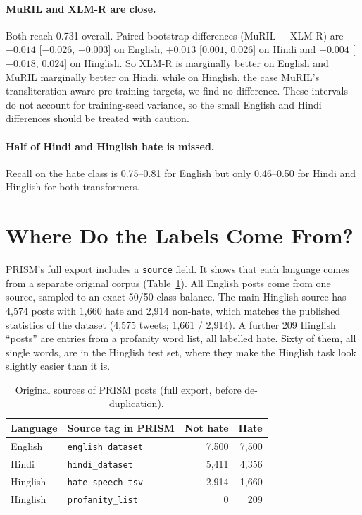 \documentclass[11pt,a4paper]{article}
\begin{document}
\paragraph{MuRIL and XLM-R are close.}
Both reach 0.731 overall.
Paired bootstrap differences (MuRIL $-$ XLM-R) are $-0.014$ [$-0.026$, $-0.003$] on English, $+0.013$ [$0.001$, $0.026$] on Hindi and $+0.004$ [$-0.018$, $0.024$] on Hinglish.
So XLM-R is marginally better on English and MuRIL marginally better on Hindi, while on Hinglish, the case MuRIL's transliteration-aware pre-training targets, we find no difference.
These intervals do not account for training-seed variance, so the small English and Hindi differences should be treated with caution.

\paragraph{Half of Hindi and Hinglish hate is missed.}
Recall on the hate class is 0.75--0.81 for English but only 0.46--0.50 for Hindi and Hinglish for both transformers.

\section{Where Do the Labels Come From?}
\label{sec:provenance}

PRISM's full export includes a \texttt{source} field.
It shows that each language comes from a separate original corpus (Table~\ref{tab:sources}).
All English posts come from one source, sampled to an exact 50/50 class balance.
The main Hinglish source has 4,574 posts with 1,660 hate and 2,914 non-hate, which matches the published statistics of the \citet{bohra2018dataset} dataset (4,575 tweets; 1,661 / 2,914).
A further 209 Hinglish ``posts'' are entries from a profanity word list, all labelled hate. Sixty of them, all single words, are in the Hinglish test set, where they make the Hinglish task look slightly easier than it is.

\begin{table}[h]
\centering
\small
\begin{tabular}{llrr}
\toprule
Language & Source tag in PRISM & Not hate & Hate \\
\midrule
English & \texttt{english\_dataset} & 7,500 & 7,500 \\
Hindi & \texttt{hindi\_dataset} & 5,411 & 4,356 \\
Hinglish & \texttt{hate\_speech\_tsv} & 2,914 & 1,660 \\
Hinglish & \texttt{profanity\_list} & 0 & 209 \\
\bottomrule
\end{tabular}
\caption{Original sources of PRISM posts (full export, before de-duplication).}
\label{tab:sources}
\end{table}
\end{document}
